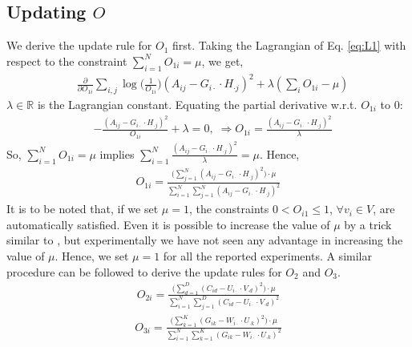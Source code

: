 \documentclass[letterpaper]{article} %
\begin{document}
\subsection{Updating $O$}
We derive the update rule for $O_1$ first. Taking the Lagrangian of Eq. \ref{eq:L1} with respect to the constraint $\sum\limits_{i=1}^N O_{1i} = \mu$, we get,
\begin{align}
& \frac{\partial }{\partial O_{1i}} \sum\limits_{i,j}\log\Big({\frac{1}{O_{1i}}}\Big) (A_{ij} - G_{i\cdot} \cdot H_{\cdot j})^2 + \lambda(\sum\limits_{i} O_{1i} - \mu) \nonumber
\end{align}
$\lambda \in \mathbb{R}$ is the Lagrangian constant. Equating the partial derivative w.r.t. $O_{1i}$ to 0:
\begin{align*}
&-\frac{(A_{ij} - G_{i\cdot} \cdot H_{\cdot j})^2}{O_{1i}} + \lambda = 0, \;
\Rightarrow O_{1i} = \frac{(A_{ij} - G_{i\cdot} \cdot H_{\cdot j})^2}{\lambda}
\end{align*}
So, $\sum\limits_{i=1}^N O_{1i} = \mu$ implies $\sum\limits_{i=1}^N \frac{(A_{ij} - G_{i\cdot} \cdot H_{\cdot j})^2}{\lambda} = \mu$. Hence,
\begin{align}\label{eq:O1}
\boxed{
O_{1i} = \frac{
\Big(\sum_{j=1}^N(A_{ij} - G_{i\cdot}\cdot H_{\cdot j})^2 \Big) \cdot \mu
}
{
\sum_{i=1}^N\sum_{j=1}^N(A_{ij} - G_{i\cdot}\cdot H_{\cdot j})^{2}
}
}
\end{align}
It is to be noted that, if we set $\mu = 1$, the constraints $0 < O_{i1} \leq 1$, $\forall v_i \in V$, are automatically satisfied. Even it is possible to increase the value of $\mu$ by a trick similar to \cite{gupta2012integrating}, but experimentally we have not seen any advantage in increasing the value of $\mu$. Hence, we set $\mu = 1$ for all the reported experiments. A similar procedure can be followed to derive the update rules for $O_2$ and $O_3$.
\begin{align}\label{eq:O2}
\boxed{
O_{2i} = \frac{
\Big(\sum_{d=1}^D(C_{id} - U_{i\cdot}\cdot V_{\cdot d})^2 \Big) \cdot \mu
}
{
\sum_{i=1}^N\sum_{j=1}^D(C_{id} - U_{i\cdot}\cdot V_{\cdot d})^{2}
}
}
\end{align}
\begin{align}\label{eq:O3}
\boxed{
O_{3i} = \frac{
\Big( \sum_{k=1}^K(G_{ik} - W_{i\cdot}\cdot U_{\cdot k})^2 \Big) \cdot \mu
}
{
\sum_{i=1}^N\sum_{k=1}^K(G_{ik} - W_{i\cdot}\cdot U_{\cdot k})^2
}
}
\end{align}
\end{document}
